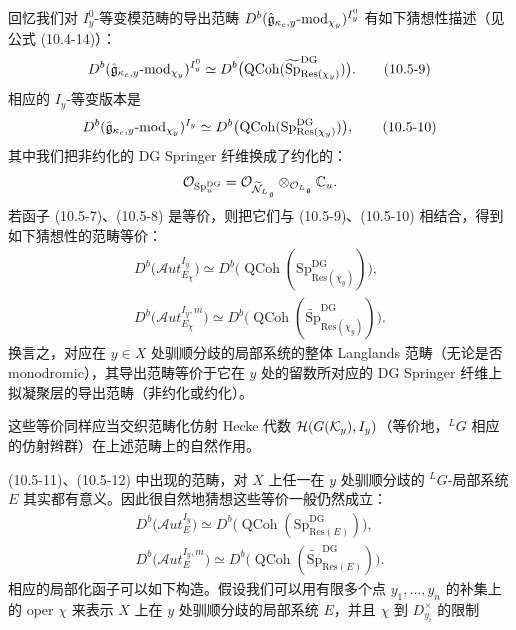 回忆我们对 $I^0_y$-等变模范畴的导出范畴 $D^b(\hat{\mathfrak{g}}_{\kappa_c,y}\text{-mod}_{\chi_y})^{I^0_y}$ 有如下猜想性描述（见公式 (10.4-14)）：
\begin{equation}
    D^b(\hat{\mathfrak{g}}_{\kappa_c,y}\text{-mod}_{\chi_y})^{I^0_y}
    \simeq D^b\bigl(\operatorname{QCoh}(\widetilde{\mathrm{Sp}}^{\mathrm{DG}}_{\mathrm{Res}(\chi_y)})\bigr).
    \tag{10.5-9}
\end{equation}
相应的 $I_y$-等变版本是
\begin{equation}
    D^b(\hat{\mathfrak{g}}_{\kappa_c,y}\text{-mod}_{\chi_y})^{I_y}
    \simeq D^b\bigl(\operatorname{QCoh}(\mathrm{Sp}^{\mathrm{DG}}_{\mathrm{Res}(\chi_y)})\bigr),
    \tag{10.5-10}
\end{equation}
其中我们把非约化的 DG Springer 纤维换成了约化的：
\[
    \mathcal{O}_{\mathrm{Sp}^{\mathrm{DG}}_u}
    = \mathcal{O}_{\widetilde{\mathcal{N}}_{{}^L\mathfrak{g}}}
    \otimes_{\mathcal{O}_{{}^L\mathfrak{g}}}\mathbb{C}_u .
\]
若函子 (10.5-7)、(10.5-8) 是等价，则把它们与 (10.5-9)、(10.5-10) 相结合，得到如下猜想性的范畴等价：
\begin{gather}
    D^b\bigl(\mathcal{A}ut^{I_y}_{E_\chi}\bigr)
    \simeq D^b\bigl(\operatorname{QCoh}(\mathrm{Sp}^{\mathrm{DG}}_{\mathrm{Res}(\chi_y)})\bigr),
    \tag{10.5-11}\\
    D^b\bigl(\mathcal{A}ut^{I_y,m}_{E_\chi}\bigr)
    \simeq D^b\bigl(\operatorname{QCoh}(\widetilde{\mathrm{Sp}}^{\mathrm{DG}}_{\mathrm{Res}(\chi_y)})\bigr).
    \tag{10.5-12}
\end{gather}
换言之，对应在 $y\in X$ 处驯顺分歧的局部系统的整体 Langlands 范畴（无论是否 monodromic），其导出范畴等价于它在 $y$ 处的留数所对应的 DG Springer 纤维上拟凝聚层的导出范畴（非约化或约化）。

这些等价同样应当交织范畴化仿射 Hecke 代数 $\mathcal{H}(G(\mathcal{K}_y),I_y)$（等价地，${}^L G$ 相应的仿射辫群）在上述范畴上的自然作用。

(10.5-11)、(10.5-12) 中出现的范畴，对 $X$ 上任一在 $y$ 处驯顺分歧的 ${}^L G$-局部系统 $E$ 其实都有意义。因此很自然地猜想这些等价一般仍然成立：
\begin{gather}
    D^b\bigl(\mathcal{A}ut^{I_y}_{E}\bigr)
    \simeq D^b\bigl(\operatorname{QCoh}(\mathrm{Sp}^{\mathrm{DG}}_{\mathrm{Res}(E)})\bigr),
    \tag{10.5-13}\\
    D^b\bigl(\mathcal{A}ut^{I_y,m}_{E}\bigr)
    \simeq D^b\bigl(\operatorname{QCoh}(\widetilde{\mathrm{Sp}}^{\mathrm{DG}}_{\mathrm{Res}(E)})\bigr).
    \tag{10.5-14}
\end{gather}
相应的局部化函子可以如下构造。假设我们可以用有限多个点 $y_1,\dots,y_n$ 的补集上的 oper $\chi$ 来表示 $X$ 上在 $y$ 处驯顺分歧的局部系统 $E$，并且 $\chi$ 到 $D^\times_{y_i}$ 的限制

